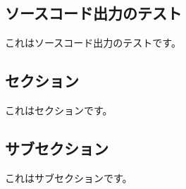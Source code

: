 	\newpage
	\subsection{ソースコード出力のテスト}
		これはソースコード出力のテストです。
		\begin{soucecode}[language=TeX,caption=基本的な\LaTeX 文書,label=lst:test]

\section{セクション}
	これはセクションです。

	\subsection{サブセクション}
		これはサブセクションです。


		\end{soucecode}

